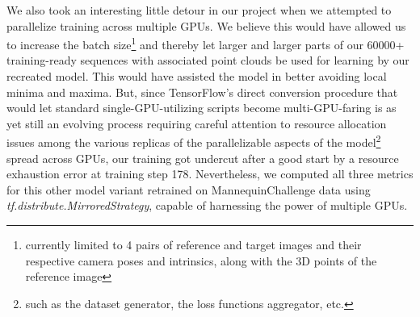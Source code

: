 We also took an interesting little detour in our project when we attempted to parallelize training across multiple GPUs. We believe this would have allowed us to increase the batch size\footnote{currently limited to 4 pairs of reference and target images and their respective camera poses and intrinsics, along with the 3D points of the reference image} and thereby let larger and larger parts of our 60000+ training-ready sequences with associated point clouds be used for learning by our recreated model. This would have assisted the model in better avoiding local minima and maxima. But, since TensorFlow's direct conversion procedure that would let standard single-GPU-utilizing scripts become multi-GPU-faring is as yet still an evolving process requiring careful attention to resource allocation issues among the various replicas of the parallelizable aspects of the model\footnote{such as the dataset generator, the loss functions aggregator, etc.} spread across GPUs, our training got undercut after a good start by a resource exhaustion error at training step 178. Nevertheless, we computed all three metrics for this other model variant retrained on MannequinChallenge data using \textit{tf.distribute.MirroredStrategy}, capable of harnessing the power of multiple GPUs.

